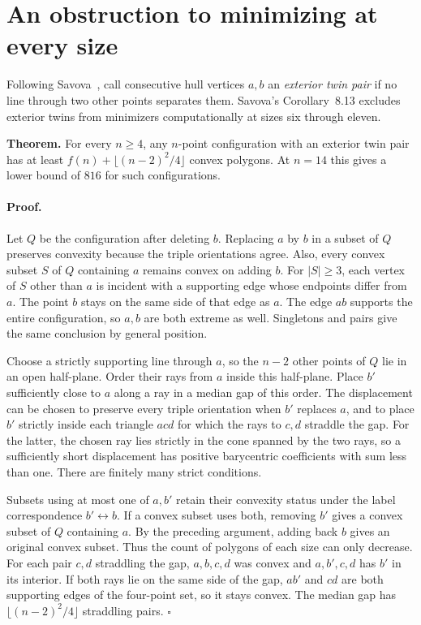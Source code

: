 \documentclass[11pt]{article}
\begin{document}
\newpage
\section{An obstruction to minimizing at every size}
Following Savova~\cite[Section~8]{savova}, call consecutive hull vertices $a,b$ an \emph{exterior twin pair} if no line through two other points separates them. Savova's Corollary~8.13 excludes exterior twins from minimizers computationally at sizes six through eleven.

\medskip
\noindent\textbf{Theorem.} For every $n\ge4$, any $n$-point configuration with an exterior twin pair has at least $f(n)+\lfloor(n-2)^2/4\rfloor$ convex polygons. At $n=14$ this gives a lower bound of $816$ for such configurations.

\paragraph{Proof.} Let $Q$ be the configuration after deleting $b$. Replacing $a$ by $b$ in a subset of $Q$ preserves convexity because the triple orientations agree. Also, every convex subset $S$ of $Q$ containing $a$ remains convex on adding $b$. For $|S|\ge3$, each vertex of $S$ other than $a$ is incident with a supporting edge whose endpoints differ from $a$. The point $b$ stays on the same side of that edge as $a$. The edge $ab$ supports the entire configuration, so $a,b$ are both extreme as well. Singletons and pairs give the same conclusion by general position.

Choose a strictly supporting line through $a$, so the $n-2$ other points of $Q$ lie in an open half-plane. Order their rays from $a$ inside this half-plane. Place $b'$ sufficiently close to $a$ along a ray in a median gap of this order. The displacement can be chosen to preserve every triple orientation when $b'$ replaces $a$, and to place $b'$ strictly inside each triangle $acd$ for which the rays to $c,d$ straddle the gap. For the latter, the chosen ray lies strictly in the cone spanned by the two rays, so a sufficiently short displacement has positive barycentric coefficients with sum less than one. There are finitely many strict conditions.

Subsets using at most one of $a,b'$ retain their convexity status under the label correspondence $b'\leftrightarrow b$. If a convex subset uses both, removing $b'$ gives a convex subset of $Q$ containing $a$. By the preceding argument, adding back $b$ gives an original convex subset. Thus the count of polygons of each size can only decrease. For each pair $c,d$ straddling the gap, $a,b,c,d$ was convex and $a,b',c,d$ has $b'$ in its interior. If both rays lie on the same side of the gap, $ab'$ and $cd$ are both supporting edges of the four-point set, so it stays convex. The median gap has $\lfloor(n-2)^2/4\rfloor$ straddling pairs. \hfill$\square$
\end{document}
